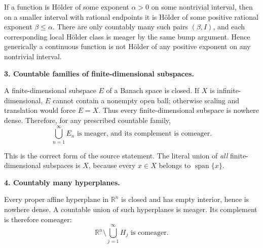\begin{solution}
If a function is Hölder of some exponent \(\alpha>0\) on some nontrivial
interval, then on a smaller interval with rational endpoints it is Hölder
of some positive rational exponent \(\beta\le\alpha\). There are only
countably many such pairs \((\beta,I)\), and each corresponding local
Hölder class is meager by the same bump argument. Hence generically a
continuous function is not Hölder of any positive exponent on any
nontrivial interval.

\par\smallskip\noindent\textbf{3. Countable families of finite-dimensional subspaces.}

A finite-dimensional subspace \(E\) of a Banach space is closed. If \(X\) is
infinite-dimensional, \(E\) cannot contain a nonempty open ball; otherwise
scaling and translation would force \(E=X\). Thus every finite-dimensional
subspace is nowhere dense. Therefore, for any prescribed countable family,
\[
\boxed{
\bigcup_{n=1}^\infty E_n
\text{ is meager, and its complement is comeager}.}
\]

This is the correct form of the source statement. The literal union of
\emph{all} finite-dimensional subspaces is \(X\), because every
\(x\in X\) belongs to \(\operatorname{span}\{x\}\).

\par\smallskip\noindent\textbf{4. Countably many hyperplanes.}

Every proper affine hyperplane in \(\mathbb R^n\) is closed and has empty
interior, hence is nowhere dense. A countable union of such hyperplanes is
meager. Its complement is therefore comeager:
\[
\boxed{
\mathbb R^n\setminus\bigcup_{j=1}^\infty H_j
\text{ is comeager}.}
\]
\end{solution}


